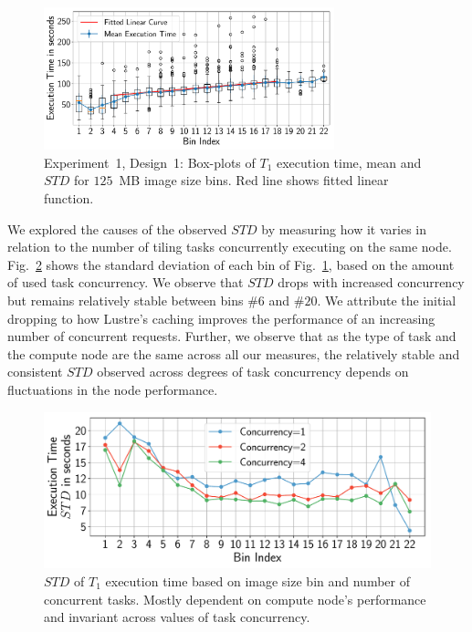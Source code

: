 \begin{figure}[t]
    \centering
    \includegraphics[width=0.75\textwidth]{figures/designs/stage_0_tx_box.pdf}
    \caption{Experiment~1, Design~1: Box-plots of $T_{1}$ execution time, mean and $STD$ for $125$~MB image size bins.
        Red line shows fitted linear function.}\label{fig:stage_0_execution}
\end{figure}

We explored the causes of the observed $STD$ by measuring how it varies in relation to the number of tiling tasks concurrently executing on the same node.
Fig.~\ref{fig:concurrency_test} shows the standard deviation of each bin of Fig.~\ref{fig:stage_0_execution}, based on the amount of used task concurrency.
We observe that $STD$ drops with increased concurrency but remains relatively stable between bins $\#6$ and $\#20$.
We attribute the initial dropping to how Lustre's caching improves the performance of an increasing number of concurrent requests.
Further, we observe that as the type of task and the compute node are the same across all our measures, the relatively stable and consistent $STD$ observed across degrees of task concurrency depends on fluctuations in the node performance.

\begin{figure}[t]
    \centering
    \includegraphics[width=.75\textwidth]{figures/designs/concerrency_std.pdf}
    \caption{$STD$ of $T_{1}$ execution time based on image size bin and number of concurrent tasks.
        Mostly dependent on compute node's performance and invariant across values of task concurrency.}\label{fig:concurrency_test}
\end{figure}

